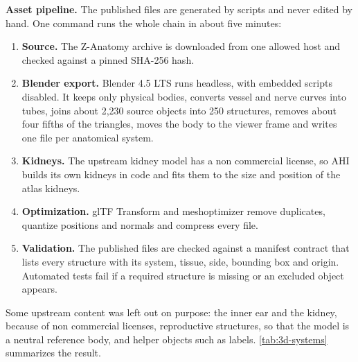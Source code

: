 \medskip\noindent\textbf{Asset pipeline.} The published files are generated by scripts and never edited by hand. One command runs the whole chain in about five minutes:

\begin{enumerate}
\item \textbf{Source.} The Z-Anatomy archive is downloaded from one allowed host and checked against a pinned SHA-256 hash.
\item \textbf{Blender export.} Blender 4.5 LTS runs headless, with embedded scripts disabled. It keeps only physical bodies, converts vessel and nerve curves into tubes, joins about 2,230 source objects into 250 structures, removes about four fifths of the triangles, moves the body to the viewer frame and writes one file per anatomical system.
\item \textbf{Kidneys.} The upstream kidney model has a non commercial license, so AHI builds its own kidneys in code and fits them to the size and position of the atlas kidneys.
\item \textbf{Optimization.} glTF Transform and meshoptimizer remove duplicates, quantize positions and normals and compress every file.
\item \textbf{Validation.} The published files are checked against a manifest contract that lists every structure with its system, tissue, side, bounding box and origin. Automated tests fail if a required structure is missing or an excluded object appears.
\end{enumerate}

Some upstream content was left out on purpose: the inner ear and the kidney, because of non commercial licenses, reproductive structures, so that the model is a neutral reference body, and helper objects such as labels. \ref{tab:3d-systems} summarizes the result.

